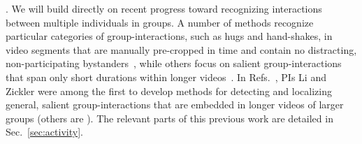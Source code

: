 
. We will build directly on recent progress toward recognizing interactions between multiple individuals in groups. A number of methods recognize particular categories of group-interactions, such as hugs and hand-shakes, in video segments that are manually pre-cropped in time and contain no distracting, non-participating bystanders~\cite{Intille:act,Ni:group,Lan:Group,Patron-PerezMRZ12,PrabhakarR12}, while others focus on salient group-interactions that span only short durations within longer videos~\cite{Hongeng:act,Hakeem:act,Ba:meeting,McCowan:meeting,CHIL, Choi:recogtrack, Ryoo:group, Regh2013}. In Refs.~\cite{groupdet2013,LiIJCV2012,Li2010}, PIs Li and Zickler were among the first  to develop methods  for detecting and localizing general, salient group-interactions that are embedded in longer videos of larger groups (others are \cite{Cristani:fformation,Amer:group}). The  relevant parts of this previous work are detailed in Sec.~\ref{sec:activity}.



